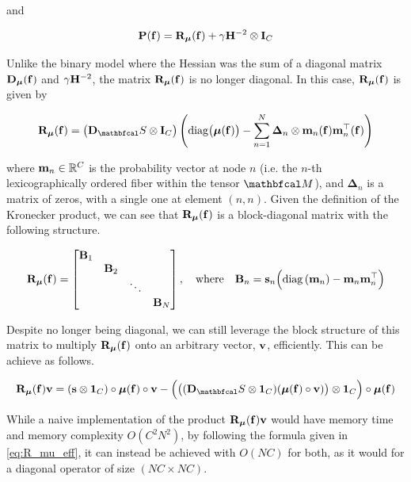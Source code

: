 and

\begin{equation}
    \mathbf{P}(\mathbf{f}) = \mathbf{R}_{\boldsymbol{\mu}}(\mathbf{f}) + \gamma \mathbf{H}^{-2} \otimes \mathbf{I}_C
\end{equation}

Unlike the binary model where the Hessian was the sum of a diagonal matrix $\mathbf{D}_{\boldsymbol{\mu}}(\mathbf{f})$ and $\gamma \mathbf{H}^{-2}$, the matrix $\mathbf{R}_{\boldsymbol{\mu}}(\mathbf{f})$ is no longer diagonal. In this case, $\mathbf{R}_{\boldsymbol{\mu}}(\mathbf{f})$ is given by 

\begin{equation}
    \RR_{\muu}(\f) =  \big(\D_\St \otimes \I_C\big) \left(\Diag{\muu(\f)} - \sum_{n=1}^N \mathbf{\Delta}_{n} \otimes \m_n (\f) \m_n^\top(\f) \right)
\end{equation}

where $\mathbf{m}_n \in \mathbb{R}^C$ is the probability vector at node $n$ (i.e. the $n$-th lexicographically ordered fiber within the tensor $\Mt$), and $\mathbf{\Delta}_{n}$ is a matrix of zeros, with a single one at element $(n, n)$. Given the definition of the Kronecker product, we can see that $\mathbf{R}_{\boldsymbol{\mu}}(\mathbf{f})$ is a block-diagonal matrix with the following structure. 

\begin{equation*}
    \mathbf{R}_{\boldsymbol{\mu}}(\mathbf{f}) = \begin{bmatrix}
        \mathbf{B}_1 & & & \\
        & \mathbf{B}_2 & & \\
        & & \ddots & \\
        & & & \mathbf{B}_N
    \end{bmatrix}, \quad \text{where} \quad \mathbf{B}_n = \mathbf{s}_n \Big(\text{\textup{diag}}\left(\mathbf{m}_n\right) - \mathbf{m}_n \mathbf{m}_n^\top\Big)
\end{equation*}

Despite no longer being diagonal, we can still leverage the block structure of this matrix to multiply $\mathbf{R}_{\boldsymbol{\mu}}(\mathbf{f})$ onto an arbitrary vector, $\mathbf{v}$, efficiently. This can be achieve as follows. 


\begin{equation}
    \label{eq:R_mu_eff}
    \RR_{\muu}(\f) \ve = (\s \otimes \one_C) \circ  \muu(\f) \circ \ve - \Big(\big((\D_\St \otimes \one_C) (\muu(\f) \circ \ve) \big) \otimes \one_C \Big) \circ \muu(\f)
\end{equation}

While a naive implementation of the product $\mathbf{R}_{\boldsymbol{\mu}}(\mathbf{f}) \mathbf{v}$ would have memory time and memory complexity $O\left(C^2N^2\right)$, by following the formula given in \cref{eq:R_mu_eff}, it can instead be achieved with $O(NC)$ for both, as it would for a diagonal operator of size $(NC \times NC)$. 

